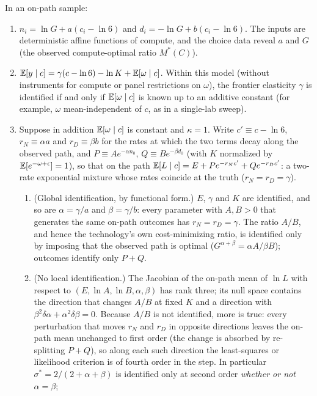 \begin{proposition}\label{prop:fd}
In an on-path sample:
\begin{enumerate}
\item[(i)] $n_i=\ln G+a(c_i-\ln6)$ and $d_i=-\ln G+b(c_i-\ln6)$. The inputs are deterministic affine functions of compute,
and the choice data reveal $a$ and $G$ (the observed compute-optimal ratio $M^*(C)$).
\item[(ii)] $\mathbb{E}[y\mid c]=\gamma(c-\ln6)-\ln K+\mathbb{E}[\omega\mid c]$. Within this model (without instruments for compute or
panel restrictions on $\omega$), the frontier elasticity $\gamma$ is identified if and only if $\mathbb{E}[\omega\mid c]$ is known up
to an additive constant (for example, $\omega$ mean-independent of $c$, as in a single-lab sweep).
\item[(iii)] Suppose in addition $\mathbb{E}[\omega\mid c]$ is constant and $\kappa=1$. Write $c'\equiv c-\ln6$, $r_N\equiv\alpha a$
and $r_D\equiv\beta b$ for the rates at which the two terms decay along the observed path, and $P\equiv Ae^{-\alpha n_0}$,
$Q\equiv Be^{-\beta d_0}$ (with $K$ normalized by $\mathbb{E}[e^{-\omega+\epsilon}]=1$), so that on the path
$\mathbb{E}[L\mid c]=E+Pe^{-r_Nc'}+Qe^{-r_Dc'}$: a two-rate exponential mixture whose rates coincide at the truth
($r_N=r_D=\gamma$).
\begin{enumerate}
\item[(a)] (Global identification, by functional form.) $E$, $\gamma$ and $K$ are identified, and so are $\alpha=\gamma/a$
and $\beta=\gamma/b$: every parameter with $A,B>0$ that generates the same on-path outcomes has $r_N=r_D=\gamma$. The ratio
$A/B$, and hence the technology's own cost-minimizing ratio, is identified only by imposing that the observed path is
optimal ($G^{\alpha+\beta}=\alpha A/\beta B$); outcomes identify only $P+Q$.
\item[(b)] (No local identification.) The Jacobian of the on-path mean of $\ln L$ with respect to $(E,\ln A,\ln B,\alpha,\beta)$
has rank three; its null space contains the direction that changes $A/B$ at fixed $K$ and a direction with
$\beta^2\delta\alpha+\alpha^2\delta\beta=0$. Because $A/B$ is not identified, more is true: every perturbation that moves
$r_N$ and $r_D$ in opposite directions leaves the on-path mean unchanged to first order (the change is absorbed by
re-splitting $P+Q$), so along each such direction the least-squares or likelihood criterion is of fourth order in the
step. In particular $\sigma^*=2/(2+\alpha+\beta)$ is identified only at second order \emph{whether or not} $\alpha=\beta$;

\end{enumerate}
\end{enumerate}
\end{proposition}
